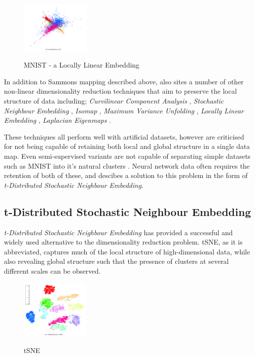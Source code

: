 \documentclass[a4paper,11pt,titlepage]{article}
\begin{document}
 	\begin{figure}[H]
    			\centering	
			{{\includegraphics[width=0.3\textwidth]
    				{img/hinton_lle.png} 
    			}}%
    			\caption{MNIST - a Locally Linear Embedding}%
    		\label{fig:3nn}
	\end{figure}	 
 		
		\par 
		In addition to Sammons mapping described above, \cite{VanderMaaten2009} also sites a number of other non-linear dimensionality reduction techniques that aim to preserve the local structure of data including; \textit{Curvilinear Component Analysis} \cite{Demartines1995}, \textit{Stochastic Neighbour Embedding} \cite{Hinton2002}, \textit{Isomap} \cite{Tenenbaum2000}, \textit{Maximum Variance Unfolding} \cite{Weinberger2004}, \textit{Locally Linear Embedding} \cite{Roweis2000}, \textit{Laplacian Eigenmaps} \cite{Belkin2002}.

		\par 
		These techniques all perform well with artificial datasets, however are criticised for not being capable of retaining both local and global structure in a single data map. Even semi-supervised variants are not capable of separating simple datasets such as MNIST into it's natural clusters \cite{Song2007}. Neural network data often requires the retention of both of these, and \cite{Maaten2008} descibes a solution to this problem in the form of \textit{t-Distributed Stochastic Neighbour Embedding}.

	 		
 \subsection{t-Distributed Stochastic Neighbour Embedding}
 \textit{t-Distributed Stochastic Neighbour Embedding} \cite{Maaten2008} has provided a successful and widely used alternative to the dimensionality reduction problem. tSNE, as it is abbreviated, captures much of the local structure of high-dimensional data, while also revealing global structure such that the presence of clusters at several different scales can be observed.
		\par 
		
	\begin{figure}[H]
    			\centering	
			{{\includegraphics[width=0.3\textwidth]
    				{img/hinton_tsne.png} 
    			}}%
    			\caption{tSNE}%
    		\label{fig:3nn}
	\end{figure}	  
	
\end{document}
